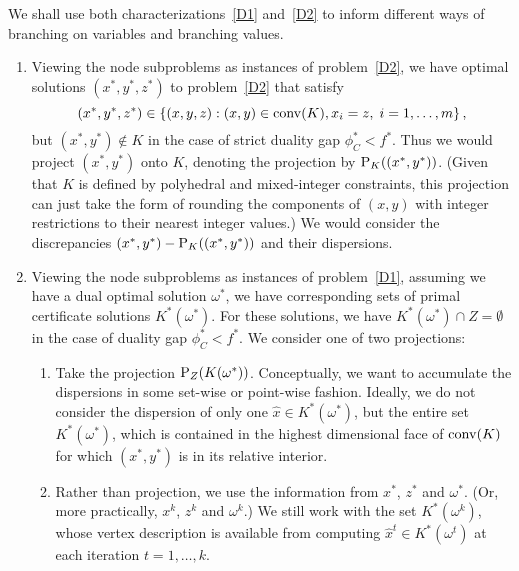 We shall use both characterizations~\eqref{D1} and~\eqref{D2} to inform different ways of branching on variables and branching values. 
\begin{enumerate}
\item Viewing the node subproblems as instances of problem~\eqref{D2}, we have optimal solutions $(x^*,y^*,z^*)$ to problem~\eqref{D2} that satisfy 
$$(x^*,y^*,z^*) \in \left\{ (x,y,z) : (x,y) \in \operatorname{conv}(K), x_i=z,\; i=1,\dots,m \right \},$$ 
but $(x^*,y^*) \not\in K$ in the case of strict duality gap $\phi_C^* < f^*$. Thus we would project $(x^*,y^*)$ onto $K$, denoting the projection by $\text{P}_K((x^*,y^*))$. (Given that $K$ is defined by polyhedral and mixed-integer constraints, this projection can just take the form of rounding the components of $(x,y)$ with integer restrictions to their nearest integer values.) We would consider the discrepancies $(x^*,y^*) - \text{P}_K((x^*,y^*))$ and their dispersions. 
\item Viewing the node subproblems as instances of problem~\eqref{D1}, assuming we have a dual optimal solution $\omega^*$, we have corresponding sets of primal certificate solutions $K^*(\omega^*)$. For these solutions, we have $K^*(\omega^*) \cap  Z = \emptyset$ in the case of duality gap $\phi_C^* < f^*$. We consider one of two projections:
\begin{enumerate}
\item Take the projection $\text{P}_Z(K(\omega^*))$. Conceptually, we want to accumulate the dispersions in some set-wise or point-wise fashion.
Ideally, we do not consider the dispersion of only one $\widehat{x} \in K^*(\omega^*)$, but the entire set $K^*(\omega^*)$, which is contained in the highest dimensional face of $\operatorname{conv}(K)$ for which $(x^*,y^*)$ is in its relative interior.
\item Rather than projection, we use the information from $x^*$, $z^*$ and $\omega^*$. (Or, more practically, $x^k$, $z^k$ and $\omega^k$.) We still work with the set $K^*(\omega^k)$, whose vertex description is available from computing $\widehat{x}^t \in K^*(\omega^t)$ at each iteration $t=1,\dots,k$.
\end{enumerate}
\end{enumerate}



